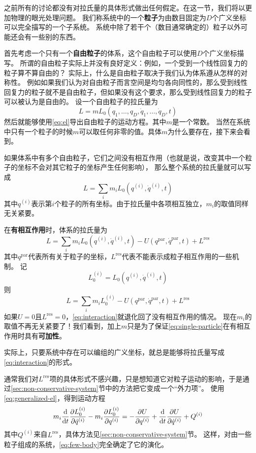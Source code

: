\documentclass[UTF8, a4paper]{ctexart}
\begin{document}
之前所有的讨论都没有对拉氏量的具体形式做出任何假定。在这一节，我们将以更加物理的眼光处理问题。
我们称系统中的一个\textbf{粒子}为由数目固定为$D$个广义坐标可以完全描写的一个子系统。
系统中除了若干个（数目通常确定的）粒子以外可能还会有一些别的东西。

首先考虑一个只有一个\textbf{自由粒子}的体系，这个自由粒子可以使用$D$个广义坐标描写。
所谓的自由粒子实际上并没有良好定义：例如，一个受到一个线性回复力的粒子算不算自由的？
实际上，什么是自由粒子取决于我们认为体系遵从怎样的对称性。
例如如果我们认为对自由粒子而言空间是均匀各向同性的，那么受到线性回复力的粒子就不是自由粒子，但如果没有这个要求，那么受到线性回复力的粒子可以被认为是自由的。
设一个自由粒子的拉氏量为
\begin{equation}
    L = m L_0(q_1, \ldots, q_D, \dot{q}_1, \ldots, \dot{q}_D, t)
    \label{eq:single-particle}
\end{equation}
然后就能够使用\eqref{eq:el}导出自由粒子的运动方程。其中$m$是一个常数。
当然在系统中只有一个粒子的时候$m$可以取任何非零的值。具体$m$为什么要存在，接下来会看到。

如果体系中有多个自由粒子，它们之间没有相互作用（也就是说，改变其中一个粒子的坐标不会对其它粒子的坐标产生任何影响），
那么整个系统的拉氏量就可以写成
\[
    L = \sum_i m_i L_0(q^{(i)}, \dot{q}^{(i)}, t)
\]
其中$q^{(i)}$表示第$i$个粒子的所有坐标。由于拉氏量中各项相互独立，$m_i$的取值同样无关紧要。

在\textbf{有相互作用}时，体系的拉氏量为
\[
    L = \sum_i m_i L_0(q^{(i)}, \dot{q}^{(i)}, t) - U(q^{\text{par}}, \dot{q}^{\text{par}}, t) + L^{\text{res}}
\]
其中$q^\text{par}$代表所有关于粒子的坐标，$L^\text{res}$代表不能表示成粒子相互作用的一些机制。
记
\begin{equation}
    L^{(i)}_0 = L_0(q^{(i)}, \dot{q}^{(i)}, t)
\end{equation}
则
\begin{equation}
    L = \sum_i m_i L_0^{(i)} - U(q^{\text{par}}, \dot{q}^{\text{par}}, t) + L^{\text{res}}
    \label{eq:interaction}
\end{equation}
如果$U=0$且$L^\text{res}=0$，\eqref{eq:interaction}就退化回了没有相互作用的情况。
现在$m_i$的取值不再无关紧要了！我们看到，加上$m$只是为了保证\eqref{eq:single-particle}在有相互作用时具有\textbf{可加性}。

实际上，只要系统中存在可以编组的广义坐标，就总是能够将拉氏量写成\eqref{eq:interaction}的形式。

通常我们对$L^\text{res}$项的具体形式不感兴趣，只是想知道它对粒子运动的影响，于是通过\ref{sec:non-conservative-system}节中的方法把它变成一个“外力项”。
使用\eqref{eq:generalized-el}，得到运动方程
\begin{equation}
    m_i \dv{t} \pdv{L_0^{(i)}}{\dot{q}^{(i)}} - m_i \pdv{L^{(i)}_0}{q^{(i)}} = - \pdv{U}{q^{(i)}} + \dv{t} \pdv{U}{\dot{q}^{(i)}} + Q^{(i)}
    \label{eq:few-body}
\end{equation}
其中$Q^{(i)}$来自$L^\text{res}$，具体方法见\ref{sec:non-conservative-system}节。
这样，对由一些粒子组成的系统，\eqref{eq:few-body}完全确定了它的演化。
\end{document}
